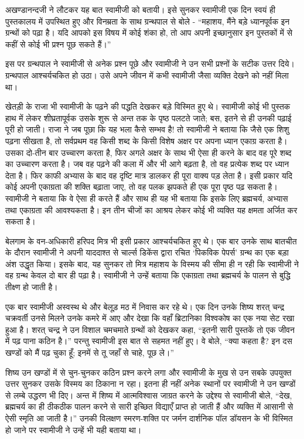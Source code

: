 अखण्डानन्दजी ने लौटकर यह बात स्वामीजी को बतायी। इसे सुनकर स्वामीजी एक दिन स्वयं ही पुस्तकालय में उपस्थित हुए और विनम्रता के साथ ग्रन्थपाल से बोले - “महाशय, मैंने बड़े ध्यानपूर्वक इन ग्रन्थों को पढ़ा है। यदि आपको इस विषय में कोई शंका हो, तो आप अपनी इच्छानुसार इन पुस्तकों में से कहीं से कोई भी प्रश्न पूछ सकते हैं।” 

इस पर ग्रन्थपाल ने स्वामीजी से अनेक प्रश्न पूछे और स्वामीजी ने उन सभी प्रश्नों के सटीक उत्तर दिये। ग्रन्थपाल आश्चर्यचकित हो उठा। उसे अपने जीवन में कभी स्वामीजी जैसा व्यक्ति देखने को नहीं मिला था। 

खेतड़ी के राजा भी स्वामीजी के पढ़ने की पद्धति देखकर बड़े विस्मित हुए थे। स्वामीजी कोई भी पुस्तक हाथ में लेकर शीघ्रतापूर्वक उसके शुरू से अन्त तक के पृष्ठ पलटते जाते; बस, इतने से ही उनकी पढ़ाई पूरी हो जाती। राजा ने जब पूछा कि यह भला कैसे सम्भव है! तो स्वामीजी ने बताया कि जैसे एक शिशु पढ़ना सीखता है, तो सर्वप्रथम वह किसी शब्द के किसी विशेष अक्षर पर अपना ध्यान एकाग्र करता है। उसका दो-तीन बार उच्चारण करता है, फिर अगले अक्षर के साथ भी ऐसा ही करने के बाद वह पूरे शब्द का उच्चारण करता है। जब वह पढ़ने की कला में और भी आगे बढ़ता है, तो वह प्रत्येक शब्द पर ध्यान देता है। फिर काफी अभ्यास के बाद वह दृष्टि मात्र डालकर ही पूरा वाक्य पड़ लेता है। इसी प्रकार यदि कोई अपनी एकाग्रता की शक्ति बढ़ाता जाए, तो वह पलक झपकते ही एक पूरा पृष्ठ पढ़ सकता है। स्वामीजी ने बताया कि वे ऐसा ही करते हैं और साथ ही यह भी बताया कि इसके लिए ब्रह्मचर्य, अभ्यास तथा एकाग्रता की आवश्यकता है। इन तीन चीजों का आश्रय लेकर कोई भी व्यक्ति यह क्षमता अर्जित कर सकता है। 

बेलगाम के वन-अधिकारी हरिपद मित्र भी इसी प्रकार आश्चर्यचकित हुए थे। एक बार उनके साथ बातचीत के दौरान स्वामीजी ने अपनी याददाश्त से चार्ल्स डिकेंस द्वारा रचित ‘पिकविक पेपर्स’ ग्रन्थ का एक बड़ा अंश उद्धृत किया। इसके बाद, यह सुनकर तो मित्र महाशय के विस्मय की सीमा ही न रही कि स्वामीजी ने वह ग्रन्थ केवल दो बार ही पढ़ा है। स्वामीजी ने उन्हें बताया कि एकाग्रता तथा ब्रह्मचर्य के पालन से बुद्धि तीक्ष्ण हो जाती है। 

एक बार स्वामीजी अस्वस्थ थे और बेलूड़ मठ में निवास कर रहे थे। एक दिन उनके शिष्य शरत् चन्द्र चक्रवर्ती उनसे मिलने उनके कमरे में आए और देखा कि वहाँ ब्रिटानिका विश्वकोष का एक नया सेट रखा हुआ है। शरत् चन्द्र ने उन विशाल चमचमाते ग्रन्थों को देखकर कहा, “इतनी सारी पुस्तकें तो एक जीवन में पढ़ पाना कठिन है।” परन्तु स्वामीजी इस बात से सहमत नहीं हुए। वे बोले, “क्या कहता है? इन दस खण्डों को मैं पढ़ चुका हूँ; इनमें से तू जहाँ से चाहे, पूछ ले।” 

शिष्य उन खण्डों में से चुन-चुनकर कठिन प्रश्न करने लगा और स्वामीजी के मुख से उन सबके उपयुक्त उत्तर सुनकर उसके विस्मय का ठिकाना न रहा। इतना ही नहीं अनेक स्थानों पर स्वामीजी ने उन खण्डों से लम्बे उद्धरण भी दिए। अन्त में शिष्य में आत्मविश्वास जाग्रत करने के उद्देश्य से स्वामीजी बोले, “देख, ब्रह्मचर्य का ही ठीकठीक पालन करने से सारी इच्छित विद्याएँ प्राप्त हो जाती हैं और व्यक्ति में आसानी से ऐसी स्मृति आ जाती है।” उनकी विलक्षण स्मरण-शक्ति पर जर्मन दार्शनिक पॉल डॉयसन के भी विस्मित हो जाने पर स्वामीजी ने उन्हें भी यही बताया था। 

